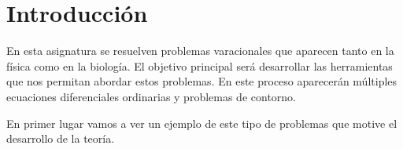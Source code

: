 \documentclass{article}
\begin{document}
\maketitle

\section{Introducción}

En esta asignatura se resuelven problemas varacionales que aparecen tanto en la física como en la
biología. El objetivo principal será desarrollar las herramientas que nos permitan abordar estos
problemas. En este proceso aparecerán múltiples ecuaciones diferenciales ordinarias y problemas de
contorno.

En primer lugar vamos a ver un ejemplo de este tipo de problemas que motive el desarrollo de la
teoría.
\end{document}
